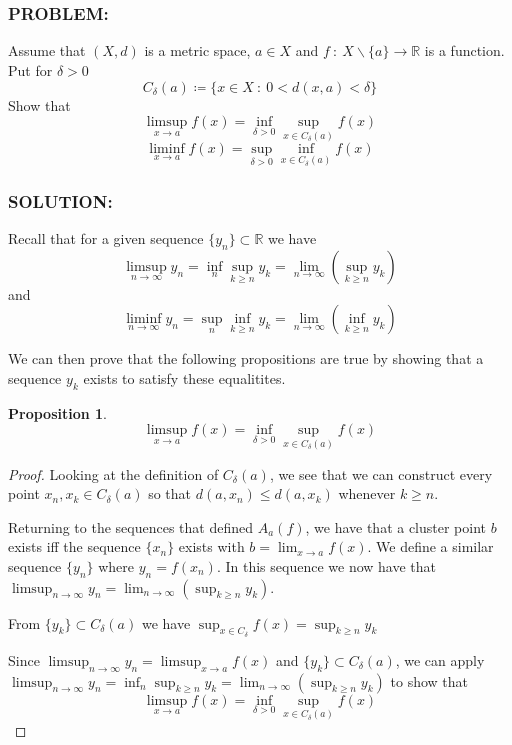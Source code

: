 \documentclass[]{article}
\newcommand{\Problem}{\subsubsection*{\textbf{PROBLEM:}}}
\newcommand{\Solution}{\subsubsection*{\textbf{SOLUTION:}}}
\newcommand{\R}{\mathbb{R}}
\newcommand{\st}{\ : \ }
\newtheorem{proposition}{Proposition}
\begin{document}
\newpage
\section{}
\Problem
Assume that $(X,d)$ is a metric space, $a \in X$ and $f \st X \backslash \{a\} \to \R$ is a function.
Put for $\delta > 0$ \[
    C_\delta(a) \coloneqq \{x \in X \st 0 < d(x,a) < \delta\}
\] Show that \[
    \limsup_{x \to a} f(x) = \inf_{\delta > 0} \sup_{x \in C_\delta(a)} f(x)
\]\[
    \liminf_{x \to a} f(x) = \sup_{\delta > 0} \inf_{x \in C_\delta(a)} f(x)
\]

\Solution

Recall that for a given sequence $\{y_n\} \subset \R$ we have \[
    \limsup_{n\to\infty} y_n = \inf_{n} \sup_{k \geq n} y_k = \lim_{n\to\infty} (\sup_{k\geq n} y_k)
\] and \[
    \liminf_{n\to\infty} y_n = \sup_{n} \inf_{k \geq n} y_k = \lim_{n\to\infty} (\inf_{k\geq n} y_k)
\]

We can then prove that the following propositions are true by showing that a sequence $y_k$ exists to satisfy these equalitites.

\begin{proposition}
    \[\limsup_{x \to a} f(x) = \inf_{\delta > 0} \sup_{x \in C_\delta(a)} f(x)\]
\end{proposition}
\begin{proof}
    Looking at the definition of $C_\delta(a)$, we see that we can construct every point $x_n,x_k \in C_\delta(a)$ so that $d(a, x_{n}) \leq d(a,x_{k})$ whenever $k \geq n$.

    Returning to the sequences that defined $A_a(f)$, we have that a cluster point $b$ exists iff the sequence $\{x_n\}$ exists with $b = \lim_{x \to a} f(x)$.
    We define a similar sequence $\{y_n\}$ where $y_n = f(x_n)$.
    In this sequence we now have that $\limsup_{n\to\infty} y_n = \lim_{n\to\infty} (\sup_{k\geq n} y_k)$.
    
    From $\{y_k\} \subset C_\delta(a)$ we have $\sup_{x \in C_\delta} f(x) = \sup_{k\geq n} y_k$

    Since $\limsup_{n\to\infty} y_n = \limsup_{x \to a} f(x)$ and $\{y_k\} \subset C_\delta(a)$, we can apply $\limsup_{n\to\infty} y_n = \inf_{n} \sup_{k \geq n} y_k = \lim_{n\to\infty} (\sup_{k\geq n} y_k)$ to show that \[\limsup_{x \to a} f(x) = \inf_{\delta > 0} \sup_{x \in C_\delta(a)} f(x)\]
\end{proof}
\end{document}
